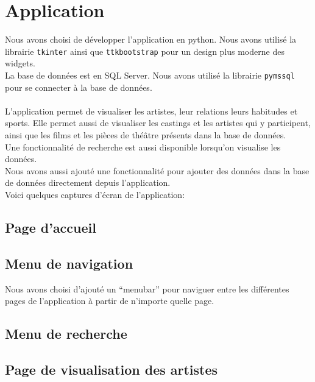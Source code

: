 \documentclass{article}
\newcommand{\n}{\\ [6pt]}
\begin{document}
\newpage
\section{Application}
Nous avons choisi de développer l'application en python. Nous avons
utilisé la librairie \texttt{tkinter} ainsi que \texttt{ttkbootstrap}
pour un design plus moderne des widgets.\n
La base de données est en SQL Server. Nous avons utilisé la librairie
\texttt{pymssql} pour se connecter à la base de données.\n\n
L'application permet de visualiser les artistes, leur relations
leurs habitudes et sports. Elle permet aussi de visualiser les
castings et les artistes qui y participent, ainsi que les films et les
pièces de théâtre présents dans la base de données.\n
Une fonctionnalité de recherche est aussi disponible lorsqu'on
visualise les données.\n
Nous avons aussi ajouté une fonctionnalité pour ajouter des données
dans la base de données directement depuis l'application.\n
Voici quelques captures d'écran de l'application:

\subsection{Page d'accueil}
\begin{center}
\end{center}

\subsection{Menu de navigation}
Nous avons choisi d'ajouté un ``menubar'' pour naviguer entre les
différentes pages de l'application à partir de n'importe quelle page.
\begin{center}
\end{center}


\subsection{Menu de recherche}

\begin{center}
\end{center}

\subsection{Page de visualisation des artistes}
\end{document}
